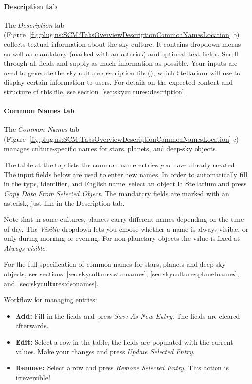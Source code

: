 \paragraph{Description tab}
The \textit{Description} tab (Figure~\ref{fig:plugins:SCM:TabsOverviewDescriptionCommonNamesLocation} b) collects textual information about the sky culture.
It contains dropdown menus as well as mandatory (marked with an asterisk) and optional text fields.
Scroll through all fields and supply as much information as possible.
Your inputs are used to generate the sky culture description file (), which Stellarium will use to display certain information to users.
For details on the expected content and structure of this file, see section~\ref{sec:skycultures:description}.

\paragraph{Common Names tab}
The \textit{Common Names} tab (Figure~\ref{fig:plugins:SCM:TabsOverviewDescriptionCommonNamesLocation} c) manages culture-specific names for stars, planets, and deep-sky objects.

The table at the top lists the common name entries you have already created.
The input fields below are used to enter new names.
In order to automatically fill in the type, identifier, and English name, select an object in Stellarium and press \textit{Copy Data From Selected Object}.
The mandatory fields are marked with an asterisk, just like in the Description tab.

Note that in some cultures, planets carry different names depending on the time of day.
The \textit{Visible} dropdown lets you choose whether a name is always visible, or only during morning or evening.
For non-planetary objects the value is fixed at \textit{Always visible}.

For the full specification of common names for stars, planets and deep-sky objects, see sections~\ref{sec:skycultures:starnames}, \ref{sec:skycultures:planetnames}, and~\ref{sec:skycultures:dsonames}.

\noindent Workflow for managing entries:
\begin{itemize}
\item \textbf{Add:} Fill in the fields and press \textit{Save As New Entry}. The fields are cleared afterwards.
\item \textbf{Edit:} Select a row in the table; the fields are populated with the current values. Make your changes and press \textit{Update Selected Entry}.
\item \textbf{Remove:} Select a row and press \textit{Remove Selected Entry}. This action is irreversible!
\end{itemize}

